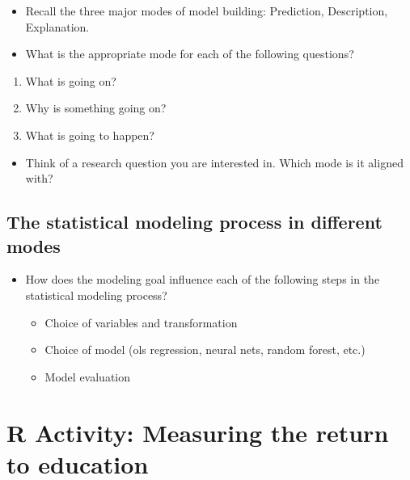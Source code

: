 \documentclass[
]{book}
\providecommand{\tightlist}{%
  \setlength{\itemsep}{0pt}\setlength{\parskip}{0pt}}
\theoremstyle{definition}
\theoremstyle{definition}
\theoremstyle{definition}
\theoremstyle{definition}
\theoremstyle{remark}
\begin{document}
\begin{itemize}
\tightlist
\item
  Recall the three major modes of model building: Prediction, Description, Explanation.
\item
  What is the appropriate mode for each of the following questions?
\end{itemize}

\begin{enumerate}
\def\labelenumi{\arabic{enumi}.}
\tightlist
\item
  What is going on?
\item
  Why is something going on?
\item
  What is going to happen?
\end{enumerate}

\begin{itemize}
\tightlist
\item
  Think of a research question you are interested in. Which mode is it aligned with?
\end{itemize}

\hypertarget{the-statistical-modeling-process-in-different-modes}{%
\subsection{The statistical modeling process in different modes}\label{the-statistical-modeling-process-in-different-modes}}

\begin{itemize}
\item
  How does the modeling goal influence each of the following steps in the statistical modeling process?

  \begin{itemize}
  \item
    Choice of variables and transformation
  \item
    Choice of model (ols regression, neural nets, random forest, etc.)
  \item
    Model evaluation
  \end{itemize}
\end{itemize}

\hypertarget{r-activity-measuring-the-return-to-education}{%
\section{R Activity: Measuring the return to education}\label{r-activity-measuring-the-return-to-education}}
\end{document}
